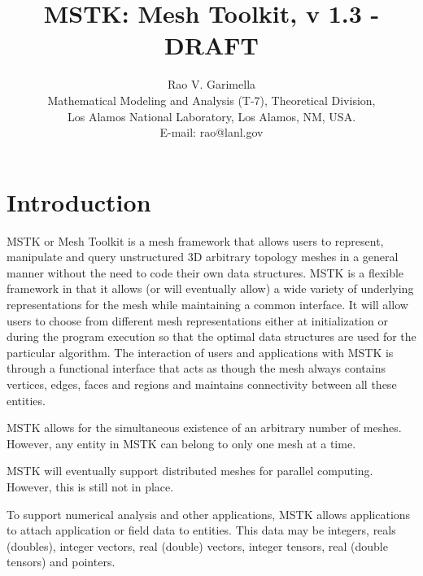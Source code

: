 \documentclass[12pt]{article}
\begin{document}
\title{MSTK: Mesh Toolkit, v 1.3 - DRAFT} 


\author{Rao V. Garimella \\
  Mathematical Modeling and Analysis (T-7), Theoretical Division, \\
  Los Alamos National Laboratory, Los Alamos, NM, USA. \\ E-mail:
  rao@lanl.gov}

\maketitle

\thispagestyle{empty}
\setlength{\parindent}{0.0in}
\setlength{\parskip}{0.5em}

\newpage
\section{Introduction}

MSTK or Mesh Toolkit is a mesh framework that allows users to
represent, manipulate and query unstructured 3D arbitrary topology
meshes in a general manner without the need to code their own data
structures. MSTK is a flexible framework in that it allows (or will
eventually allow) a wide variety of underlying representations for the
mesh while maintaining a common interface. It will allow users to
choose from different mesh representations either at initialization or
during the program execution so that the optimal data structures are
used for the particular algorithm. The interaction of users and
applications with MSTK is through a functional interface that acts as
though the mesh always contains vertices, edges, faces and regions and
maintains connectivity between all these entities.

\par MSTK allows for the simultaneous existence of an arbitrary number of
meshes. However, any entity in MSTK can belong to only one mesh at a
time.

\par MSTK will eventually support distributed meshes for parallel
computing. However, this is still not in place.

\par To support numerical analysis and other applications, MSTK allows
applications to attach application or field data to entities. This
data may be integers, reals (doubles), integer vectors, real (double)
vectors, integer tensors, real (double tensors) and pointers.
\end{document}
